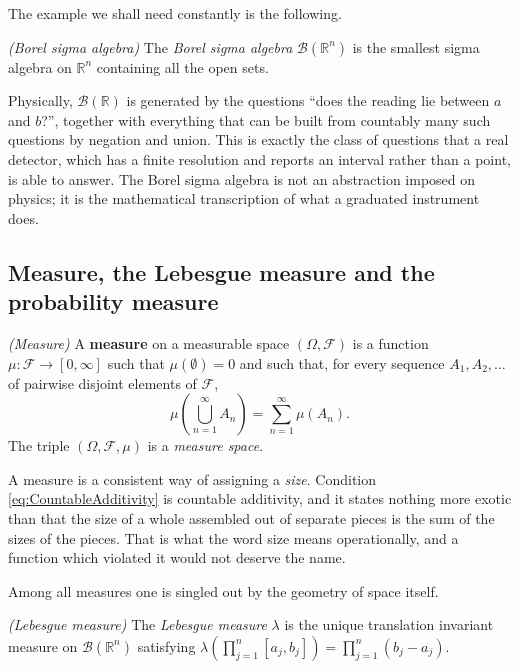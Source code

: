 		The example we shall need constantly is the following.

		\begin{myDef}
			\textit{(Borel sigma algebra)} The \emph{Borel sigma algebra}
			$\mathcal{B}(\mathbb{R}^{n})$ is the smallest sigma algebra on $\mathbb{R}^{n}$
			containing all the open sets.
		\end{myDef}

		Physically, $\mathcal{B}(\mathbb{R})$ is generated by the questions ``does the reading
		lie between $a$ and $b$?'', together with everything that can be built from countably
		many such questions by negation and union. This is exactly the class of questions that a
		real detector, which has a finite resolution and reports an interval rather than a
		point, is able to answer. The Borel sigma algebra is not an abstraction imposed on
		physics; it is the mathematical transcription of what a graduated instrument does.

	\subsection{Measure, the Lebesgue measure and the probability measure}

		\begin{myDef}
			\textit{(Measure)} A \textbf{measure} on a measurable space $(\Omega,\mathcal{F})$
			is a function $\mu:\mathcal{F}\to[0,\infty]$ such that $\mu(\emptyset)=0$ and such
			that, for every sequence $A_{1},A_{2},\dots$ of pairwise disjoint elements of
			$\mathcal{F}$,
			\begin{equation}\label{eq:CountableAdditivity}
				\mu\left(\bigcup_{n=1}^{\infty}A_{n}\right) = \sum_{n=1}^{\infty}\mu(A_{n}).
			\end{equation}
			The triple $(\Omega,\mathcal{F},\mu)$ is a \emph{measure space}.
		\end{myDef}

		A measure is a consistent way of assigning a \textit{size}. Condition
		\eqref{eq:CountableAdditivity} is countable additivity, and it states nothing more
		exotic than that the size of a whole assembled out of separate pieces is the sum of the
		sizes of the pieces. That is what the word size means operationally, and a function
		which violated it would not deserve the name.

		Among all measures one is singled out by the geometry of space itself.

		\begin{myDef}
			\textit{(Lebesgue measure)} The \emph{Lebesgue measure} $\lambda$ is the unique
			translation invariant measure on $\mathcal{B}(\mathbb{R}^{n})$ satisfying
			$\lambda\left(\prod_{j=1}^{n}[a_{j},b_{j}]\right) = \prod_{j=1}^{n}(b_{j}-a_{j})$.
		\end{myDef}


